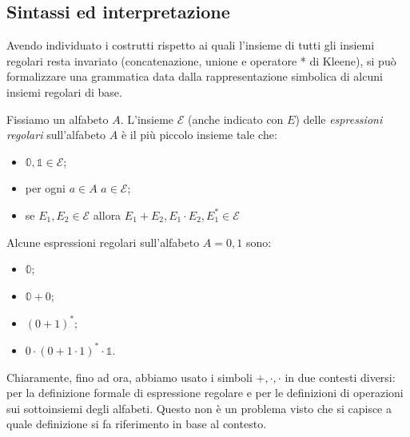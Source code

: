\subsection{Sintassi ed interpretazione}
Avendo individuato i costrutti rispetto ai quali l’insieme di tutti gli insiemi regolari resta invariato (concatenazione, unione e operatore * di Kleene), si può formalizzare una grammatica data dalla rappresentazione
simbolica di alcuni insiemi regolari di base.
\begin{defi}
    Fissiamo un alfabeto $A$. L'insieme $\mathcal E$ (anche indicato con $E$) delle \textit{espressioni regolari} sull'alfabeto 
$A$ è il più piccolo insieme tale che: 
\begin{itemize}
    \item $\mathbb  0, \mathbb 1 \in \mathcal E$;

    \item  per ogni $a \in A$ $a \in \mathcal E$;

    \item se $E_1, E_2 \in \mathcal E $ allora 
    \(
    E_1 + E_2,
    E_1 \cdot E_2,
    E_1^*\in \mathcal E
    \)
\end{itemize}
\end{defi}
\begin{exam}
    Alcune espressioni regolari sull’alfabeto $A= {0,1}$ sono:
    \begin{itemize}
        \item $\mathbb 0$;

        \item $\mathbb 0+0$;

        \item $(0+1)^*$;

        \item $0\cdot (0+1\cdot 1)^*\cdot \mathbb 1$.
    \end{itemize}
\end{exam}
\begin{rema}
    Chiaramente, fino ad ora, abbiamo usato i simboli $+,\cdot, \cdot$ in due contesti diversi: per la definizione formale di espressione regolare e per le definizioni di operazioni sui sottoinsiemi degli alfabeti.
    Questo non è un problema visto che si capisce a quale definizione si fa riferimento in base al contesto.
\end{rema}
